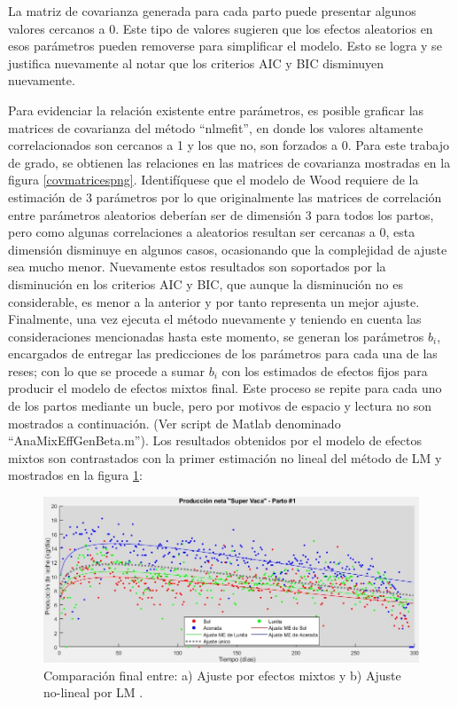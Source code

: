 La matriz de covarianza generada para cada parto puede presentar algunos valores cercanos a 0. Este tipo de valores sugieren que los efectos aleatorios en esos parámetros pueden removerse para simplificar el modelo. Esto se logra y se justifica nuevamente al notar que los criterios AIC y BIC disminuyen nuevamente.

Para evidenciar la relación existente entre parámetros, es posible graficar las matrices de covarianza del método ``nlmefit'', en donde los valores altamente correlacionados son cercanos a 1 y los que no, son forzados a 0. Para este trabajo de grado, se obtienen las relaciones en las matrices de covarianza mostradas en la figura  \ref{covmatricespng}. Identifíquese que el modelo de Wood requiere de la estimación de 3 parámetros por lo que originalmente las matrices de correlación entre parámetros aleatorios deberían ser de dimensión 3 para todos los partos, pero como algunas correlaciones a aleatorios resultan ser cercanas a 0, esta dimensión disminuye en algunos casos, ocasionando que la complejidad de ajuste sea mucho menor. Nuevamente estos resultados son soportados por la disminución en los criterios AIC y BIC, que aunque la disminución no es considerable, es menor a la anterior y por tanto representa un mejor ajuste.\\

Finalmente, una vez ejecuta el método nuevamente y teniendo en cuenta las consideraciones mencionadas hasta este momento, se generan los parámetros $b_{i}$, encargados de entregar las predicciones de los parámetros para cada una de las reses; con lo que se procede a sumar $b_{i}$ con los estimados de efectos fijos para producir el modelo de efectos mixtos final. Este proceso se repite para cada uno de los partos mediante un bucle, pero por motivos de espacio y lectura no son mostrados a continuación. (Ver script de Matlab denominado ``AnaMixEffGenBeta.m''). Los resultados obtenidos por el modelo de efectos mixtos son contrastados con la primer estimación no lineal del método de LM y mostrados en la figura \ref{mixedfinalpng}:

\begin{figure}[H]
	 \begin{center}
	 \includegraphics[scale=0.60]{img/mixedfinalspa.jpg}
	 \end{center}
	 \caption{Comparación final entre: a) Ajuste por efectos mixtos y b) Ajuste no-lineal por LM . \label{mixedfinalpng}}
\end{figure}


